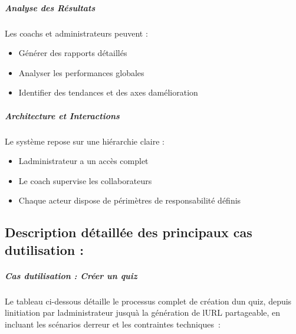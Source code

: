 \documentclass[12pt,a4paper,twoside]{report}
\begin{document}
\hypertarget{analyse-des-ruxe9sultats}{%
\subparagraph{Analyse des Résultats}\label{analyse-des-ruxe9sultats}}

Les coachs et administrateurs peuvent :

\begin{itemize}
\item
  Générer des rapports détaillés
\item
  Analyser les performances globales
\item
  Identifier des tendances et des axes d\textquotesingle amélioration
\end{itemize}

\hypertarget{architecture-et-interactions}{%
\subparagraph{Architecture et
Interactions}\label{architecture-et-interactions}}

Le système repose sur une hiérarchie claire :

\begin{itemize}
\item
  L\textquotesingle administrateur a un accès complet
\item
  Le coach supervise les collaborateurs
\item
  Chaque acteur dispose de périmètres de responsabilité définis
\end{itemize}

\hypertarget{description-duxe9tailluxe9e-des-principaux-cas-dutilisation}{%
\subsection{Description détaillée des principaux cas
d\textquotesingle utilisation
:}\label{description-duxe9tailluxe9e-des-principaux-cas-dutilisation}}

\hypertarget{cas-dutilisation-cruxe9er-un-quiz}{%
\subparagraph{Cas d\textquotesingle utilisation : Créer un
quiz}\label{cas-dutilisation-cruxe9er-un-quiz}}

Le tableau ci-dessous détaille le processus complet de création
d\textquotesingle un quiz, depuis l\textquotesingle initiation par
l\textquotesingle administrateur jusqu\textquotesingle à la génération
de l\textquotesingle URL partageable, en incluant les scénarios
d\textquotesingle erreur et les contraintes techniques~:
\end{document}
